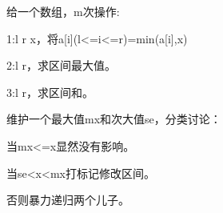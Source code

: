 给一个数组，m次操作:

1:l r x，将a[i](l<=i<=r)=min(a[i],x)

2:l r，求区间最大值。

3:l r，求区间和。

维护一个最大值mx和次大值se，分类讨论：

当mx<=x显然没有影响。

当se<x<mx打标记修改区间。

否则暴力递归两个儿子。